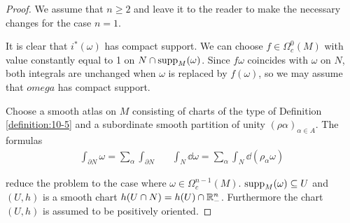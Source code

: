 \begin{proof}
  We assume that $n\ge 2$ and leave it to the reader to make the necessary
  changes for the case $n = 1$.

  It is clear that $i^*(\omega)$ has compact support. We can choose $f\in\Omega^0_c(M)$ with value
  constantly equal to 1 on $N\cap\operatorname{supp}_M(\omega)$. Since $f\omega$ coincides with $\omega$ on $N$, 
  both integrals are unchanged when $\omega$ is replaced by $f(\omega)$, so we may assume that $omega$
  has compact support.

  Choose a smooth atlas on $M$ consisting of charts of the type of Definition \ref{definition:10-5}
  and a subordinate smooth partition of unity $(\rho\alpha)_{\alpha\in A}$. The formulas
  \begin{align*}
    \int_{\partial N}\omega = \sum_{\alpha} \int_{\partial N} 
    &&
    \int_N \dd\omega = \sum_{\alpha} \int_N \dd(\rho_\alpha\omega)
  \end{align*}

  reduce the problem to the case where $\omega\in\Omega^{n-1}_c(M)$. $\operatorname{supp}_M(\omega)\subseteq U$
  and $(U, h)$ is a smooth chart $h(U\cap N) = h(U)\cap{\ensuremath{\mathbb{R}}}^n_-$. Furthermore the chart $(U, h)$
  is assumed to be positively oriented.


\end{proof}
